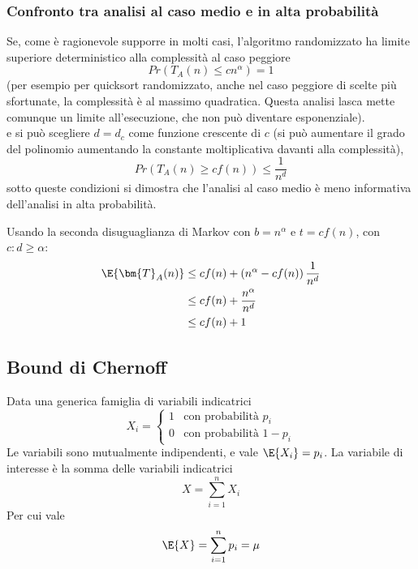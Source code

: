 \subsubsection{Confronto tra analisi al caso medio e in alta probabilità}

Se, come è ragionevole supporre in molti casi, l'algoritmo randomizzato ha limite superiore deterministico alla complessità al caso peggiore
\begin{equation*}
    Pr \left( 
        T_A(n) \leq cn^{\alpha}
    \right)
    = 1
\end{equation*}
(per esempio per quicksort randomizzato, anche nel caso peggiore di scelte più sfortunate, la complessità è al massimo quadratica.
Questa analisi lasca mette comunque un limite all'esecuzione, che non può diventare esponenziale).
\\
e si può scegliere $d = d_c$ come funzione crescente di $c$
(si può aumentare il grado del polinomio aumentando la constante moltiplicativa davanti alla complessità),
\begin{equation*}
    Pr \left( 
        T_A(n) \geq cf(n)
    \right)
    \leq
    \frac{1}{n^d}
\end{equation*}
sotto queste condizioni si dimostra che l'analisi al caso medio è meno informativa dell'analisi in alta probabilità.

Usando la seconda disuguaglianza di Markov con $
b = n^{\alpha}
$ e $
t = cf(n)
$, con $
c : d \geq \alpha
$:
\begin{align*}
    \E{
        \bm{T}_A (n)
    }
    &
    \leq
    c f(n)
    +
    \left( 
        n^{\alpha}
        -
        c f(n)
    \right)
    \frac{1}{n^d}
    \\
    &
    \leq
    c f(n)
    +
    \frac{n^{\alpha}}{n^d}
    \\
    &
    \leq
    c f(n)
    +
    1
\end{align*}

\subsection{Bound di Chernoff}

Data una generica famiglia di variabili indicatrici
\begin{equation*}
    X_i = 
    \begin{cases}
        1 & \text{con probabilità } p_i
        \\
        0 & \text{con probabilità } 1 - p_i
    \end{cases}
\end{equation*}
Le variabili sono mutualmente indipendenti, e vale $
\E{X_i} = p_i
$.
La variabile di interesse è la somma delle variabili indicatrici
\begin{equation*}
    X = 
    \sum_{i=1}^{n} X_i
\end{equation*}
Per cui vale \begin{equation*}
    \E{X}
    =
    \sum_{i=1}^{n} p_i
    =
    \mu
\end{equation*}

